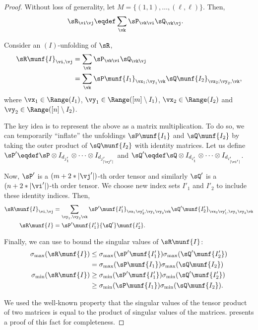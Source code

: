 \begin{proof}
  Without loss of generality, let $M = \{(1,1), \ldots, (\ell,\ell)\}$. 
  Then,
  \begin{align*}
    \sR_{\vi\vj} &\eqdef \sum_{\vk} \sP_{\vk \vi} \sQ_{\vk \vj}.
  \end{align*}

Consider an $(I)$-unfolding of $\sR$,
  \begin{align*}
    \sR\munf{I}_{\vi,\vj} 
       &= \sum_{\vk} \sP_{\vk \vi} \sQ_{\vk \vj} \\
       &= \sum_{\vk} \sP\munf{I_1}_{\vx_1; \vy_1 \vk} \sQ\munf{I_2}_{\vx_2; \vy_2, \vk},
  \end{align*}
  where $\vx_1 \in \Range(I_1)$, $\vy_1 \in \Range([m] \setminus I_1)$, $\vx_2 \in \Range(I_2)$ and $\vy_2  \in \Range([n] \setminus I_2)$.

The key idea is to represent the above as a matrix multiplication.
To do so, we can temporarily ``inflate'' the unfoldings $\sP\munf{I_1}$
  and $\sQ\munf{I_2}$ by taking the outer product of $\sQ\munf{I_2}$ with
  identity matrices. Let us define 
  $\sP' \eqdef \sP \otimes I_{d_{j'_1}} \otimes \cdots \otimes I_{d_{j'_{|\vj'|}}}$ and 
  $\sQ' \eqdef \sQ \otimes I_{d_{i'_1}} \otimes \cdots \otimes I_{d_{i'_{|\vi'|}}}$.

Now, $\sP'$ is a $(m + 2 * |\vj'|)$-th order tensor and similarly $\sQ'$ is a $(n + 2 * |\vi'|)$-th 
  order tensor. We choose new index sets $I'_1$ and $I'_2$ to include these identity indices. 
Then,
  \begin{align*}
    \sR\munf{I}_{\vi,\vj} 
    &= \sum_{\vy_1, \vy_2 \vk}
    {\sP'}\munf{I'_1}_{\vx_1\vy'_2, \vy_1 \vy_2 \vk} {\sQ'}\munf{I'_2}_{\vx_2\vy'_1, \vy_1 \vy_2 \vk} \\
          \sR\munf{I} &= {\sP'}\munf{I'_1} {\sQ'}\munf{I'_2}.
  \end{align*}

  Finally, we can use  to bound the singular values of $\sR\munf{I}$:
  \begin{align*}
    \sigma_{\max}(\sR\munf{I}) 
    &\le \sigma_{\max}({\sP'}\munf{I'_1}) \sigma_{\max}({\sQ'}\munf{I'_2}) \\
      &= \sigma_{\max}(\sP\munf{I_1}) \sigma_{\max}(\sQ\munf{I_2}) \\
    \sigma_{\min}(\sR\munf{I})  
    &\ge \sigma_{\min}({\sP'}\munf{I'_1}) \sigma_{\min}({\sQ'}\munf{I'_2}) \\
      &\ge \sigma_{\min}(\sP\munf{I_1}) \sigma_{\min}(\sQ\munf{I_2}).
  \end{align*}

  We used the well-known property that the singular values of the tensor product of two matrices is equal to the product of singular values of the matrices.  presents a proof of this fact for completeness.
\end{proof}



